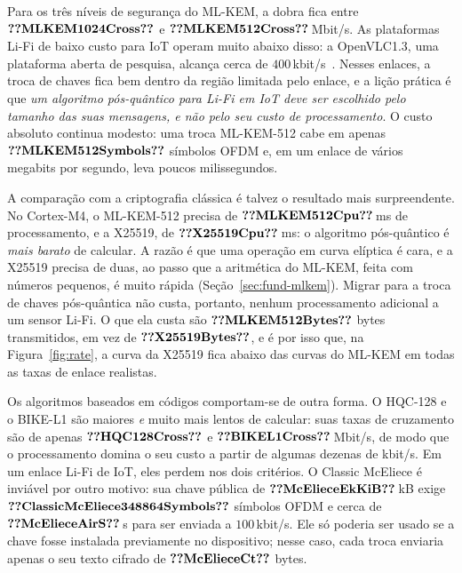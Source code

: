 \documentclass[12pt]{article}
\begin{document}
Para os três níveis de segurança do ML-KEM, a dobra fica entre
$\val{MLKEM1024Cross}$ e $\val{MLKEM512Cross}$\,Mbit/s. As plataformas Li-Fi de
baixo custo para IoT operam muito abaixo disso: a OpenVLC1.3, uma plataforma
aberta de pesquisa, alcança cerca de
$400$\,kbit/s~\cite{galisteo2019openvlc}. Nesses enlaces, a troca de chaves
fica bem dentro da região limitada pelo enlace, e a lição prática é que
\emph{um algoritmo pós-quântico para Li-Fi em IoT deve ser escolhido pelo
tamanho das suas mensagens, e não pelo seu custo de processamento}. O custo
absoluto continua modesto: uma troca ML-KEM-512 cabe em apenas
$\val{MLKEM512Symbols}$ símbolos OFDM e, em um enlace de vários megabits por
segundo, leva poucos milissegundos.

A comparação com a criptografia clássica é talvez o resultado mais
surpreendente. No Cortex-M4, o ML-KEM-512 precisa de $\val{MLKEM512Cpu}$\,ms de
processamento, e a X25519, de $\val{X25519Cpu}$\,ms: o algoritmo pós-quântico é
\emph{mais barato} de calcular. A razão é que uma operação em curva elíptica é
cara, e a X25519 precisa de duas, ao passo que a aritmética do ML-KEM, feita
com números pequenos, é muito rápida (Seção~\ref{sec:fund-mlkem}). Migrar para
a troca de chaves pós-quântica não custa, portanto, nenhum processamento
adicional a um sensor Li-Fi. O que ela custa são $\val{MLKEM512Bytes}$ bytes
transmitidos, em vez de $\val{X25519Bytes}$, e é por isso que, na
Figura~\ref{fig:rate}, a curva da X25519 fica abaixo das curvas do ML-KEM em
todas as taxas de enlace realistas.

Os algoritmos baseados em códigos comportam-se de outra forma. O HQC-128 e o
BIKE-L1 são maiores \emph{e} muito mais lentos de calcular: suas taxas de
cruzamento são de apenas $\val{HQC128Cross}$ e $\val{BIKEL1Cross}$\,Mbit/s, de
modo que o processamento domina o seu custo a partir de algumas dezenas de
kbit/s. Em um enlace Li-Fi de IoT, eles perdem nos dois critérios. O Classic
McEliece é inviável por outro motivo: sua chave pública de
$\val{McElieceEkKiB}$\,kB exige $\val{ClassicMcEliece348864Symbols}$ símbolos
OFDM e cerca de $\val{McElieceAirS}$\,s para ser enviada a $100$\,kbit/s. Ele só
poderia ser usado se a chave fosse instalada previamente no dispositivo; nesse
caso, cada troca enviaria apenas o seu texto cifrado de $\val{McElieceCt}$
bytes.
\end{document}
